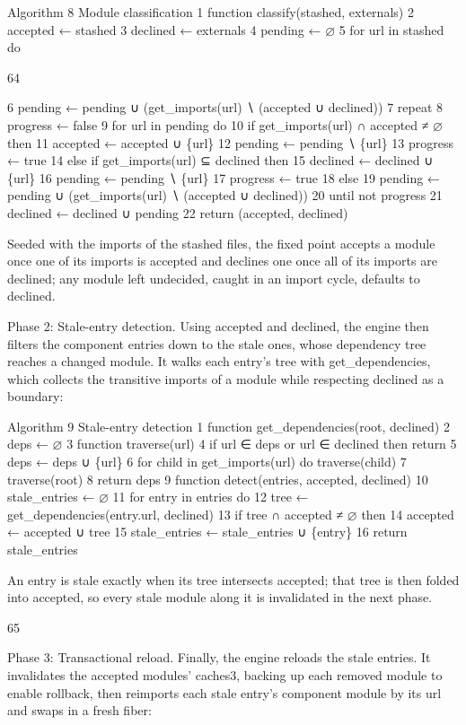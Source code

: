 \documentclass[
  10
]{article}
\begin{document}
Algorithm 8 Module classification 1 function classify(stashed,
externals) 2 accepted ← stashed 3 declined ← externals 4 pending ← ⌀ 5
for url in stashed do

64

6 pending ← pending ∪ (get\_imports(url) ∖ (accepted ∪ declined)) 7
repeat 8 progress ← false 9 for url in pending do 10 if
get\_imports(url) ∩ accepted ≠ ⌀ then 11 accepted ← accepted ∪ \{url\}
12 pending ← pending ∖ \{url\} 13 progress ← true 14 else if
get\_imports(url) ⊆ declined then 15 declined ← declined ∪ \{url\} 16
pending ← pending ∖ \{url\} 17 progress ← true 18 else 19 pending ←
pending ∪ (get\_imports(url) ∖ (accepted ∪ declined)) 20 until not
progress 21 declined ← declined ∪ pending 22 return (accepted, declined)

Seeded with the imports of the stashed files, the fixed point accepts a
module once one of its imports is accepted and declines one once all of
its imports are declined; any module left undecided, caught in an import
cycle, defaults to declined.

Phase 2: Stale-entry detection. Using accepted and declined, the engine
then filters the component entries down to the stale ones, whose
dependency tree reaches a changed module. It walks each entry's tree
with get\_dependencies, which collects the transitive imports of a
module while respecting declined as a boundary:

Algorithm 9 Stale-entry detection 1 function get\_dependencies(root,
declined) 2 deps ← ⌀ 3 function traverse(url) 4 if url ∈ deps or url ∈
declined then return 5 deps ← deps ∪ \{url\} 6 for child in
get\_imports(url) do traverse(child) 7 traverse(root) 8 return deps 9
function detect(entries, accepted, declined) 10 stale\_entries ← ⌀ 11
for entry in entries do 12 tree ← get\_dependencies(entry.url, declined)
13 if tree ∩ accepted ≠ ⌀ then 14 accepted ← accepted ∪ tree 15
stale\_entries ← stale\_entries ∪ \{entry\} 16 return stale\_entries

An entry is stale exactly when its tree intersects accepted; that tree
is then folded into accepted, so every stale module along it is
invalidated in the next phase.

65

Phase 3: Transactional reload. Finally, the engine reloads the stale
entries. It invalidates the accepted modules' caches3, backing up each
removed module to enable rollback, then reimports each stale entry's
component module by its url and swaps in a fresh fiber:
\end{document}
